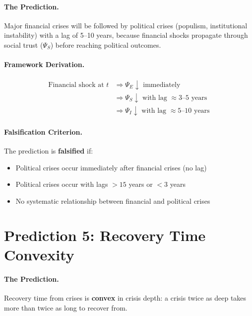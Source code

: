\paragraph{The Prediction.}
Major financial crises will be followed by political crises (populism, institutional instability) with a lag of 5--10 years, because financial shocks propagate through social trust ($\Psi_S$) before reaching political outcomes.

\paragraph{Framework Derivation.}
\begin{align}
    \text{Financial shock at } t &\Rightarrow \Psi_E \downarrow \text{ immediately} \\
    &\Rightarrow \Psi_S \downarrow \text{ with lag } \approx 3\text{--}5 \text{ years} \\
    &\Rightarrow \Psi_I \downarrow \text{ with lag } \approx 5\text{--}10 \text{ years}
\end{align}

\paragraph{Falsification Criterion.}
The prediction is \textbf{falsified} if:
\begin{itemize}
    \item Political crises occur immediately after financial crises (no lag)
    \item Political crises occur with lags $> 15$ years or $< 3$ years
    \item No systematic relationship between financial and political crises
\end{itemize}


\section{Prediction 5: Recovery Time Convexity}
\label{sec:S-prediction5}

\paragraph{The Prediction.}
Recovery time from crises is \textbf{convex} in crisis depth: a crisis twice as deep takes more than twice as long to recover from.

